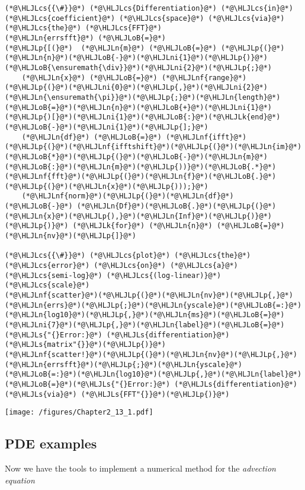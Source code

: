 \documentclass[12pt,a4paper]{article}
\newcommand{\HLJLk}[1]{\textcolor[RGB]{148,91,176}{\textbf{#1}}}
\newcommand{\HLJLn}[1]{#1}
\newcommand{\HLJLnf}[1]{\textcolor[RGB]{66,102,213}{#1}}
\newcommand{\HLJLs}[1]{\textcolor[RGB]{201,61,57}{#1}}
\newcommand{\HLJLni}[1]{\textcolor[RGB]{59,151,46}{#1}}
\newcommand{\HLJLoB}[1]{\textcolor[RGB]{102,102,102}{\textbf{#1}}}
\newcommand{\HLJLp}[1]{#1}
\newcommand{\HLJLcs}[1]{\textcolor[RGB]{153,153,119}{\textit{#1}}}
\begin{document}
\begin{lstlisting}
(*@\HLJLcs{{\#}}@*) (*@\HLJLcs{Differentiation}@*) (*@\HLJLcs{in}@*) (*@\HLJLcs{coefficient}@*) (*@\HLJLcs{space}@*) (*@\HLJLcs{via}@*) (*@\HLJLcs{the}@*) (*@\HLJLcs{FFT}@*)
(*@\HLJLn{errsfft}@*) (*@\HLJLoB{=}@*) 
(*@\HLJLp{[(}@*)  (*@\HLJLn{m}@*) (*@\HLJLoB{=}@*) (*@\HLJLp{(}@*)(*@\HLJLn{n}@*)(*@\HLJLoB{-}@*)(*@\HLJLni{1}@*)(*@\HLJLp{)}@*)(*@\HLJLoB{\ensuremath{\div}}@*)(*@\HLJLni{2}@*)(*@\HLJLp{;}@*)
    (*@\HLJLn{x}@*) (*@\HLJLoB{=}@*) (*@\HLJLnf{range}@*)(*@\HLJLp{(}@*)(*@\HLJLni{0}@*)(*@\HLJLp{,}@*)(*@\HLJLni{2}@*)(*@\HLJLn{\ensuremath{\pi}}@*)(*@\HLJLp{;}@*)(*@\HLJLn{length}@*)(*@\HLJLoB{=}@*)(*@\HLJLn{n}@*)(*@\HLJLoB{+}@*)(*@\HLJLni{1}@*)(*@\HLJLp{)[}@*)(*@\HLJLni{1}@*)(*@\HLJLoB{:}@*)(*@\HLJLk{end}@*)(*@\HLJLoB{-}@*)(*@\HLJLni{1}@*)(*@\HLJLp{];}@*)
    (*@\HLJLn{df}@*) (*@\HLJLoB{=}@*) (*@\HLJLnf{ifft}@*)(*@\HLJLp{(}@*)(*@\HLJLnf{ifftshift}@*)(*@\HLJLp{(}@*)(*@\HLJLn{im}@*)(*@\HLJLoB{*}@*)(*@\HLJLp{(}@*)(*@\HLJLoB{-}@*)(*@\HLJLn{m}@*)(*@\HLJLoB{:}@*)(*@\HLJLn{m}@*)(*@\HLJLp{))}@*)(*@\HLJLoB{.*}@*)(*@\HLJLnf{fft}@*)(*@\HLJLp{(}@*)(*@\HLJLn{f}@*)(*@\HLJLoB{.}@*)(*@\HLJLp{(}@*)(*@\HLJLn{x}@*)(*@\HLJLp{)));}@*)
    (*@\HLJLnf{norm}@*)(*@\HLJLp{(}@*)(*@\HLJLn{df}@*) (*@\HLJLoB{-}@*) (*@\HLJLn{Df}@*)(*@\HLJLoB{.}@*)(*@\HLJLp{(}@*)(*@\HLJLn{x}@*)(*@\HLJLp{),}@*)(*@\HLJLn{Inf}@*)(*@\HLJLp{)}@*) (*@\HLJLp{)}@*) (*@\HLJLk{for}@*) (*@\HLJLn{n}@*) (*@\HLJLoB{=}@*) (*@\HLJLn{nv}@*)(*@\HLJLp{]}@*)

(*@\HLJLcs{{\#}}@*) (*@\HLJLcs{plot}@*) (*@\HLJLcs{the}@*) (*@\HLJLcs{error}@*) (*@\HLJLcs{on}@*) (*@\HLJLcs{a}@*) (*@\HLJLcs{semi-log}@*) (*@\HLJLcs{(log-linear)}@*) (*@\HLJLcs{scale}@*)
(*@\HLJLnf{scatter}@*)(*@\HLJLp{(}@*)(*@\HLJLn{nv}@*)(*@\HLJLp{,}@*)(*@\HLJLn{errs}@*)(*@\HLJLp{;}@*)(*@\HLJLn{yscale}@*)(*@\HLJLoB{=:}@*)(*@\HLJLn{log10}@*)(*@\HLJLp{,}@*)(*@\HLJLn{ms}@*)(*@\HLJLoB{=}@*)(*@\HLJLni{7}@*)(*@\HLJLp{,}@*)(*@\HLJLn{label}@*)(*@\HLJLoB{=}@*)(*@\HLJLs{"{}Error:}@*) (*@\HLJLs{differentiation}@*) (*@\HLJLs{matrix"{}}@*)(*@\HLJLp{)}@*)
(*@\HLJLnf{scatter!}@*)(*@\HLJLp{(}@*)(*@\HLJLn{nv}@*)(*@\HLJLp{,}@*)(*@\HLJLn{errsfft}@*)(*@\HLJLp{;}@*)(*@\HLJLn{yscale}@*)(*@\HLJLoB{=:}@*)(*@\HLJLn{log10}@*)(*@\HLJLp{,}@*)(*@\HLJLn{label}@*)(*@\HLJLoB{=}@*)(*@\HLJLs{"{}Error:}@*) (*@\HLJLs{differentiation}@*) (*@\HLJLs{via}@*) (*@\HLJLs{FFT"{}}@*)(*@\HLJLp{)}@*)
\end{lstlisting}

\texttt{[image: /figures/Chapter2\_13\_1.pdf]}

\subsection{PDE examples}
Now we have the tools to implement a numerical method for the \emph{advection equation}
\end{document}

